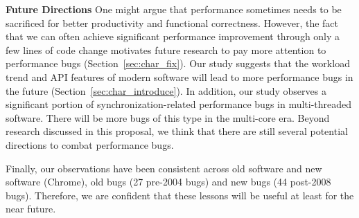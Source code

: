 {\bf Future Directions}
One might argue that performance sometimes needs
to be sacrificed for better productivity and functional correctness. However,
the fact that we can often achieve significant performance improvement through
only a few lines of code change motivates future research to pay more
attention to performance bugs (Section~\ref{sec:char_fix}).
Our study suggests 
that the workload trend and API features of modern software will lead
to more performance bugs in the future (Section~\ref{sec:char_introduce}).
In addition, our study observes a significant portion of synchronization-related
performance bugs in multi-threaded software. There will be more bugs of this
type in the multi-core era. Beyond research discussed in this proposal, we think 
that there are still several potential directions to combat performance bugs.

Finally, our observations have been consistent across old software and new 
software (Chrome), old bugs (27 pre-2004 bugs) and new bugs (44 post-2008 bugs).
Therefore, we are confident that these lessons will be useful at least 
for the near
future.

